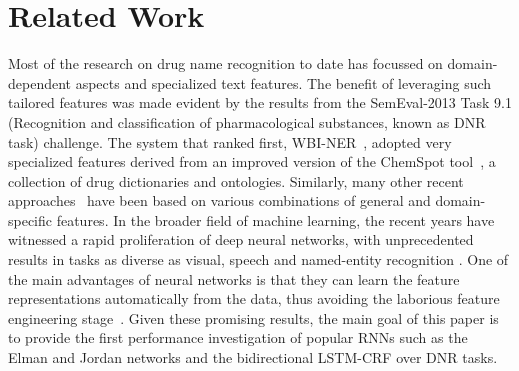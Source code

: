 \section{Related Work}
\label{supervisedDAD:RelatedWork}
Most of the research on drug name recognition to date has focussed on domain-dependent aspects and specialized text features. The benefit of leveraging such tailored features was made evident by the results from the SemEval-2013 Task 9.1 (Recognition and classification of pharmacological substances, known as DNR task) challenge. The system that ranked first, WBI-NER~\cite{huber2013wbi}, adopted very specialized features derived from an improved version of the ChemSpot tool~\cite{rocktaschel2012chemspot}, a collection of drug dictionaries and ontologies. Similarly, many other recent approaches~\cite{abacha2015text,liu2015feature,segura2015exploring} have been based on various combinations of general and domain-specific features. In the broader field of machine learning, the recent years have witnessed a rapid proliferation of deep neural networks, with unprecedented results in tasks as diverse as visual, speech and named-entity recognition \cite{hinton2012deep,krizhevsky2012imagenet,lample2016neural}. One of the main advantages of neural networks is that they can learn the feature representations automatically from the data, thus avoiding the laborious feature engineering stage~\cite{mesnil2015using,lample2016neural}. Given these promising results, the main goal of this paper is to provide the first performance investigation of popular RNNs such as the Elman and Jordan networks and the bidirectional LSTM-CRF over DNR tasks.
